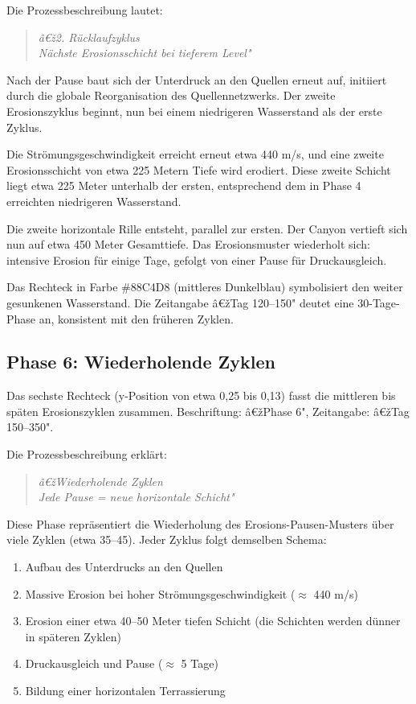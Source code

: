 ﻿\documentclass[12pt,a4paper]{report}
\begin{document}
Die Prozessbeschreibung lautet:
\begin{quote}
	\textit{â€ž2. Rücklaufzyklus\\
		Nächste Erosionsschicht bei tieferem Level"}
\end{quote}

Nach der Pause baut sich der Unterdruck an den Quellen erneut auf, initiiert durch die globale Reorganisation des Quellennetzwerks. Der zweite Erosionszyklus beginnt, nun bei einem niedrigeren Wasserstand als der erste Zyklus.

Die Strömungsgeschwindigkeit erreicht erneut etwa 440 m/s, und eine zweite Erosionsschicht von etwa 225 Metern Tiefe wird erodiert. Diese zweite Schicht liegt etwa 225 Meter unterhalb der ersten, entsprechend dem in Phase 4 erreichten niedrigeren Wasserstand.

Die zweite horizontale Rille entsteht, parallel zur ersten. Der Canyon vertieft sich nun auf etwa 450 Meter Gesamttiefe. Das Erosionsmuster wiederholt sich: intensive Erosion für einige Tage, gefolgt von einer Pause für Druckausgleich.

Das Rechteck in Farbe \#88C4D8 (mittleres Dunkelblau) symbolisiert den weiter gesunkenen Wasserstand. Die Zeitangabe â€žTag 120--150" deutet eine 30-Tage-Phase an, konsistent mit den früheren Zyklen.

\subsection{Phase 6: Wiederholende Zyklen}

Das sechste Rechteck (y-Position von etwa 0,25 bis 0,13) fasst die mittleren bis späten Erosionszyklen zusammen. Beschriftung: â€žPhase 6", Zeitangabe: â€žTag 150--350".

Die Prozessbeschreibung erklärt:
\begin{quote}
	\textit{â€žWiederholende Zyklen\\
		Jede Pause = neue horizontale Schicht"}
\end{quote}

Diese Phase repräsentiert die Wiederholung des Erosions-Pausen-Musters über viele Zyklen (etwa 35--45). Jeder Zyklus folgt demselben Schema:
\begin{enumerate}
	\item Aufbau des Unterdrucks an den Quellen
	\item Massive Erosion bei hoher Strömungsgeschwindigkeit ($\approx$ 440 m/s)
	\item Erosion einer etwa 40--50 Meter tiefen Schicht (die Schichten werden dünner in späteren Zyklen)
	\item Druckausgleich und Pause ($\approx$ 5 Tage)
	\item Bildung einer horizontalen Terrassierung
\end{enumerate}
\end{document}
